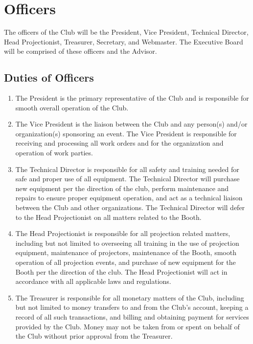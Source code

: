 \documentclass[12pt,letterpaper]{book}
\begin{document}
\chapter{Officers}

The officers of the Club will be the President, Vice President, Technical Director, Head Projectionist, Treasurer, Secretary, and Webmaster. The Executive Board will be comprised of these officers and the Advisor.

\section{Duties of Officers}

\begin{enumerate}

\item The President is the primary representative of the Club and is responsible for smooth overall operation of the Club.
\item The Vice President is the liaison between the Club and any person(s) and/or organization(s) sponsoring an event. The Vice President is responsible for receiving and processing all work orders and for the organization and operation of work parties.
\item The Technical Director is responsible for all safety and training needed for safe and proper use of all equipment. The Technical Director will purchase new equipment per the direction of the club, perform maintenance and repairs to ensure proper equipment operation, and act as a technical liaison between the Club and other organizations.  The Technical Director will defer to the Head Projectionist on all matters related to the Booth.
\item The Head Projectionist is responsible for all projection related matters, including but not limited to overseeing all training in the use of projection equipment, maintenance of projectors, maintenance of the Booth, smooth operation of all projection events, and purchase of new equipment for the Booth per the direction of the club. The Head Projectionist will act in accordance with all applicable laws and regulations.
\item The Treasurer is responsible for all monetary matters of the Club, including but not limited to money transfers to and from the Club’s account, keeping a record of all such transactions, and billing and obtaining payment for services provided by the Club. Money may not be taken from or spent on behalf of the Club without prior approval from the Treasurer.

\end{enumerate}
\end{document}

